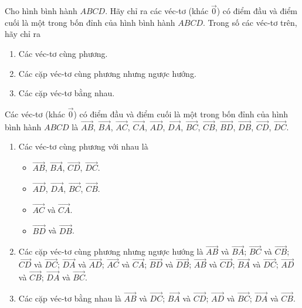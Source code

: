 \begin{bt}%
		Cho hình bình hành $ABCD$. Hãy chỉ ra các véc-tơ (khác $\overrightarrow{0}$) có điểm đầu và điểm cuối là một trong bốn đỉnh của hình bình hành $ABCD$. Trong số các véc-tơ trên, hãy chỉ ra
		\begin{enumerate}
			\item Các véc-tơ cùng phương.
			\item Các cặp véc-tơ cùng phương nhưng ngược hướng.
			\item Các cặp véc-tơ bằng nhau.
		\end{enumerate}
		\loigiai
		{
			\immini
			{
				Các véc-tơ (khác $\overrightarrow{0}$) có điểm đầu và điểm cuối là một trong bốn đỉnh của hình bình hành $ABCD$ là $\overrightarrow{AB}$, $\overrightarrow{BA}$, $\overrightarrow{AC}$, $\overrightarrow{CA}$, $\overrightarrow{AD}$, $\overrightarrow{DA}$, $\overrightarrow{BC}$, $\overrightarrow{CB}$, $\overrightarrow{BD}$, $\overrightarrow{DB}$, $\overrightarrow{CD}$, $\overrightarrow{DC}$.
			}
			{
			}
			\noindent
			\begin{enumerate}
				\item Các véc-tơ cùng phương với nhau là
				\begin{itemize}
					\item $\overrightarrow{AB}$, $\overrightarrow{BA}$, $\overrightarrow{CD}$, $\overrightarrow{DC}$.
					\item $\overrightarrow{AD}$, $\overrightarrow{DA}$, $\overrightarrow{BC}$, $\overrightarrow{CB}$.
					\item $\overrightarrow{AC}$ và $\overrightarrow{CA}$.
					\item $\overrightarrow{BD}$ và $\overrightarrow{DB}$.
				\end{itemize}
				\item Các cặp véc-tơ cùng phương nhưng ngược hướng là $\overrightarrow{AB}$ và $\overrightarrow{BA}$; $\overrightarrow{BC}$ và $\overrightarrow{CB}$; $\overrightarrow{CD}$ và $\overrightarrow{DC}$; $\overrightarrow{DA}$ và $\overrightarrow{AD}$; $\overrightarrow{AC}$ và $\overrightarrow{CA}$; $\overrightarrow{BD}$ và $\overrightarrow{DB}$; $\overrightarrow{AB}$ và $\overrightarrow{CD}$; $\overrightarrow{BA}$ và $\overrightarrow{DC}$; $\overrightarrow{AD}$ và $\overrightarrow{CB}$; $\overrightarrow{DA}$ và $\overrightarrow{BC}$.
				\item Các cặp véc-tơ bằng nhau là $\overrightarrow{AB}$ và $\overrightarrow{DC}$; $\overrightarrow{BA}$ và $\overrightarrow{CD}$; $\overrightarrow{AD}$ và $\overrightarrow{BC}$; $\overrightarrow{DA}$ và $\overrightarrow{CB}$.
			\end{enumerate}
		}
	\end{bt}

